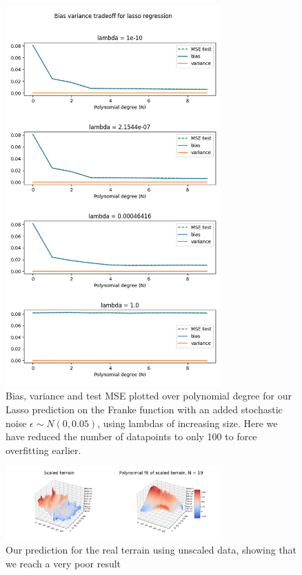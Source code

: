 \documentclass[twocolumn,10pt,cleanfoot]{asme2ej}
\begin{document}
\begin{figure}
\centerline{\includegraphics[width=3.25in]{figure/frankedifflambdaslasso.png}}
\caption{Bias, variance and test MSE plotted over polynomial degree for our Lasso prediction on the Franke function with an added stochastic noise $\epsilon \sim N(0,0.05)$, using lambdas of increasing size. Here we have reduced the number of datapoints to only 100 to force overfitting earlier.}
\label{frankedifflambdaslasso}
\end{figure}





\begin{figure}
\centerline{\includegraphics[width=3.25in]{figure/realunscaled.png}}
\caption{Our prediction for the real terrain using unscaled data, showing that we reach a very poor result}
\label{realunscaled}
\end{figure}
\end{document}
